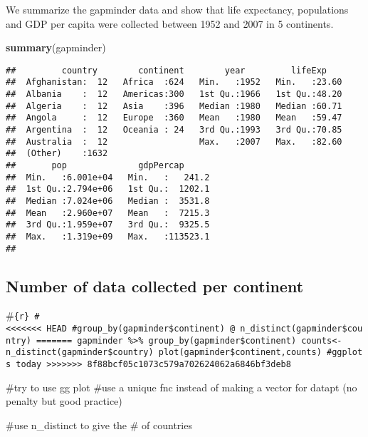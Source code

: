 \documentclass[]{article}
\newenvironment{Shaded}{\begin{snugshade}}{\end{snugshade}}
\newcommand{\KeywordTok}[1]{\textcolor[rgb]{0.13,0.29,0.53}{\textbf{#1}}}
\newcommand{\NormalTok}[1]{#1}
\begin{document}
We summarize the gapminder data and show that life expectancy,
populations and GDP per capita were collected between 1952 and 2007 in 5
continents.

\begin{Shaded}
\begin{Highlighting}[]
\KeywordTok{summary}\NormalTok{(gapminder)}
\end{Highlighting}
\end{Shaded}

\begin{verbatim}
##         country        continent        year         lifeExp     
##  Afghanistan:  12   Africa  :624   Min.   :1952   Min.   :23.60  
##  Albania    :  12   Americas:300   1st Qu.:1966   1st Qu.:48.20  
##  Algeria    :  12   Asia    :396   Median :1980   Median :60.71  
##  Angola     :  12   Europe  :360   Mean   :1980   Mean   :59.47  
##  Argentina  :  12   Oceania : 24   3rd Qu.:1993   3rd Qu.:70.85  
##  Australia  :  12                  Max.   :2007   Max.   :82.60  
##  (Other)    :1632                                                
##       pop              gdpPercap       
##  Min.   :6.001e+04   Min.   :   241.2  
##  1st Qu.:2.794e+06   1st Qu.:  1202.1  
##  Median :7.024e+06   Median :  3531.8  
##  Mean   :2.960e+07   Mean   :  7215.3  
##  3rd Qu.:1.959e+07   3rd Qu.:  9325.5  
##  Max.   :1.319e+09   Max.   :113523.1  
## 
\end{verbatim}

\hypertarget{number-of-data-collected-per-continent}{%
\subsection{Number of data collected per
continent}\label{number-of-data-collected-per-continent}}

\#\texttt{\{r\}\ \#\textless{}\textless{}\textless{}\textless{}\textless{}\textless{}\textless{}\ HEAD\ \#group\_by(gapminder\$continent)\ @\ n\_distinct(gapminder\$country)\ =======\ gapminder\ \%\textgreater{}\%\ group\_by(gapminder\$continent)\ counts\textless{}-n\_distinct(gapminder\$country)\ plot(gapminder\$continent,counts)\ \#ggplots\ today\ \textgreater{}\textgreater{}\textgreater{}\textgreater{}\textgreater{}\textgreater{}\textgreater{}\ 8f88bcf05c1073c579a702624062a6846bf3deb8}

\#try to use gg plot \#use a unique fnc instead of making a vector for
datapt (no penalty but good practice)

\#use n\_distinct to give the \# of countries
\end{document}

